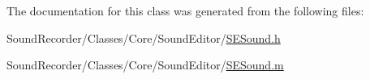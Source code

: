 The documentation for this class was generated from the following files\-:\begin{DoxyCompactItemize}
\item 
Sound\-Recorder/\-Classes/\-Core/\-Sound\-Editor/\hyperlink{_s_e_sound_8h}{S\-E\-Sound.\-h}\item 
Sound\-Recorder/\-Classes/\-Core/\-Sound\-Editor/\hyperlink{_s_e_sound_8m}{S\-E\-Sound.\-m}\end{DoxyCompactItemize}
